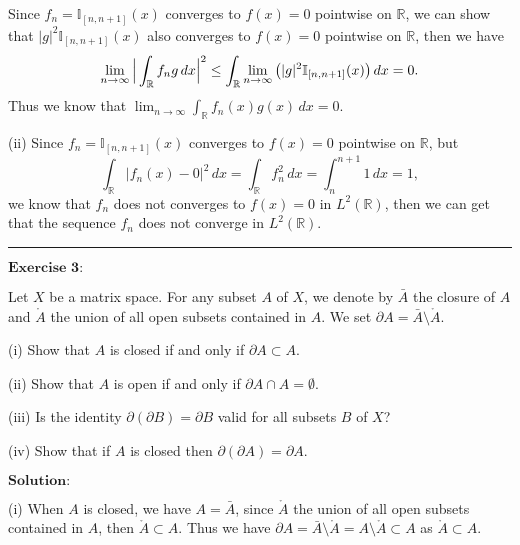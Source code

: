 \documentclass[12pt]{article}
\begin{document}
Since $f_{n} = \mathbb{I}_{[n, n+1]} (x)$ converges to $f(x) = 0$ pointwise on $\mathbb{R}$, we can show that $|g|^{2} \mathbb{I}_{[n, n+1]} (x)$ also converges to $f(x) = 0$ pointwise on $\mathbb{R}$, then we have
\begin{equation*}
    \lim_{n \to \infty} \Big{|} \int_{\mathbb{R}}^{} f_{n} g \, d x \Big{|}^{2} \leq \int_{\mathbb{R}}^{} \lim_{n \to \infty} \big{(} |g|^{2} \mathbb{I}_{[n, n+1]} (x)  \big{)} \, d x = 0.
\end{equation*}
Thus we know that $\lim_{n \to \infty} \int_{\mathbb{R}}^{} f_{n}(x) g(x) \, d x = 0$.

(ii) Since $f_{n} = \mathbb{I}_{[n, n+1]} (x)$ converges to $f(x) = 0$ pointwise on $\mathbb{R}$, but 
\begin{equation*}
    \int_{\mathbb{R}}^{} |f_{n}(x) - 0|^{2} \, d x = \int_{\mathbb{R}}^{} f_{n}^{2} \, d x = \int_{n}^{n + 1} 1 \, d x = 1,
\end{equation*}
we know that $f_{n}$ does not converges to $f(x) = 0$ in $L^{2}(\mathbb{R})$, then we can get that the sequence $f_{n}$ does not converge in $L^{2}(\mathbb{R})$.

\vspace{8pt}

\noindent\rule[0.25\baselineskip]{\textwidth}{0.5pt}

$\textbf{Exercise 3:}$

Let $X$ be a matrix space. For any subset $A$ of $X$, we denote by $\bar{A}$ the closure of $A$ and $\mathring{A}$ the union of all open subsets contained in $A$. We set $\partial A = \bar{A} \setminus \mathring{A} $.

(i) Show that $A$ is closed if and only if $\partial A \subset A$.

(ii) Show that $A$ is open if and only if $\partial A \cap A = \emptyset$.

(iii) Is the identity $\partial (\partial B) = \partial B$ valid for all subsets $B$ of $X$?
  
(iv) Show that if $A$ is closed then $\partial(\partial A) = \partial A$.

\vspace{8pt}
$\textbf{Solution:}$

(i) When $A$ is closed, we have $A = \bar{A}$, since $\mathring{A}$ the union of all open subsets contained in $A$, then $\mathring{A} \subset A$. Thus we have $\partial A = \bar{A} \setminus \mathring{A} = A \setminus \mathring{A}  \subset A$ as $\mathring{A} \subset A$.
\end{document}
